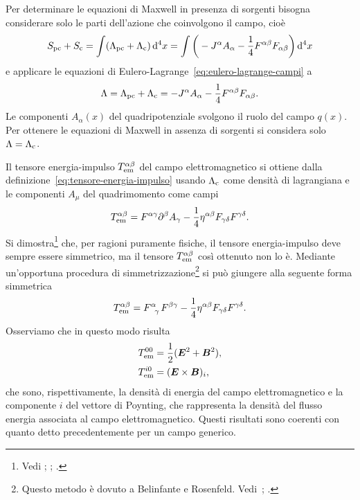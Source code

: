 Per determinare le equazioni di Maxwell in presenza
di sorgenti bisogna considerare solo le parti dell'azione che coinvolgono il
campo, cioè
\begin{equation}
  S_{\textup{pc}} + S_{\textup{c}} =  \int (\Lambda_{\textup{pc}} +
  \Lambda_{\textup{c}}) \mathop{}\!\mathrm{d}^{4} x = \int \bigg( -J^{\alpha}A_{\alpha}
  -\frac{1}{4} F^{\alpha\beta}F_{\alpha\beta} \bigg) \mathop{}\!\mathrm{d}^{4} x
\end{equation}
e applicare le equazioni di Eulero-Lagrange~\eqref{eq:eulero-lagrange-campi} a
\begin{equation}
  \Lambda = \Lambda_{\textup{pc}} + \Lambda_{\textup{c}} = -J^{\alpha}A_{\alpha}
  -\frac{1}{4} F^{\alpha\beta}F_{\alpha\beta}.
\end{equation}
Le componenti $A_{\alpha}(x)$ del quadripotenziale svolgono il ruolo del campo
$q(x)$.  Per ottenere le equazioni di Maxwell in
assenza di sorgenti si considera solo $\Lambda = \Lambda_{\textup{c}}$.

Il tensore energia-impulso $T_{\textup{em}}^{\alpha\beta}$ del campo
elettromagnetico si ottiene dalla definizione~\eqref{eq:tensore-energia-impulso}
usando $\Lambda_{\textup{c}}$ come densità di lagrangiana e le componenti
$A_{\mu}$ del quadrimomento come campi
\begin{equation}
  T_{\textup{em}}^{\alpha\beta}
  = F^{\alpha\gamma}\partial^{\beta}A_{\gamma} -
  \frac{1}{4}\eta^{\alpha\beta}F_{\gamma\delta}F^{\gamma\delta}.
\end{equation}
Si
dimostra\footnote{Vedi \textcite[419]{barone:relativita};
  \textcite[111]{landau:campi}; \textcite[141-421]{misner:gravitation}.}
che, per ragioni puramente fisiche, il tensore energia-impulso deve sempre
essere simmetrico, ma il tensore $T_{\textup{em}}^{\alpha\beta}$ così ottenuto
non lo è.  Mediante un'opportuna procedura di
simmetrizzazione\footnote{Questo metodo è dovuto a Belinfante e Rosenfeld.
  Vedi~\textcite[437]{barone:relativita}; \textcite[114]{landau:campi}.}
si può giungere alla seguente forma simmetrica
\begin{equation}
  T_{\textup{em}}^{\alpha\beta} = \tensor{F}{^{\alpha}_{\gamma}}F^{\beta\gamma}
  - \frac{1}{4}\eta^{\alpha\beta}F_{\gamma\delta}F^{\gamma\delta}.
\end{equation}
Osserviamo che in questo modo risulta
\begin{subequations}
  \begin{align}
    T_{\textup{em}}^{00} &= \frac{1}{2}(\bm{E}^{2} + \bm{B}^{2}), \\
    T_{\textup{em}}^{i0} &= (\bm{E} \times \bm{B})_{i},
  \end{align}
\end{subequations}
che sono, rispettivamente, la densità di energia del campo elettromagnetico e la
componente $i$ del vettore di Poynting, che rappresenta la densità del flusso
energia associata al campo elettromagnetico.  Questi risultati sono coerenti con
quanto detto precedentemente per un campo generico.


